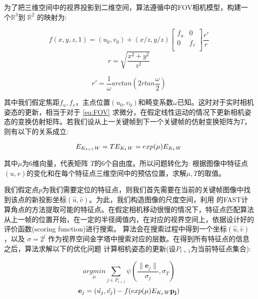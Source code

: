 为了把三维空间中的视界投影到二维空间，算法遵循\citep{deng:01a}中的FOV相机模型，构建一个$\mathbb{R}^3$到 $\mathbb{R}^2$ 的映射为:

\begin{equation}
\label{eq:FOV}
f(x,y,z,1)=(u_0,v_0) + (x/z,y/z) 
\begin{bmatrix}
       f_u  & 0 \\
       0 & f_v  \\
\end{bmatrix} \frac{r'}{r}
\end{equation}
\begin{equation}
r= \sqrt{\frac{x^2+y^2}{z^2}}
\end{equation}

\begin{equation}
r'= \frac{1}{\omega} arctan(2rtan\frac{\omega}{2})
\end{equation}

其中我们假定焦距$f_u,f_v$，主点位置$(u_0,v_0)$和畸变系数$\omega$已知。这时对于实时相机姿态的更新，相当于对于 \autoref{eq:FOV} 求微分，在假定线性运动的情况下更新相机姿态的变换仿射矩阵。若我们设从上一关键帧到下一个关键帧的仿射变换矩阵为$T$，则有以下的关系成立:

\begin{equation}
E_{K_{t+1}\mathit{W}}  = T E_{K_{t}\mathit{W}} = exp(\mu) E_{K_{t}\mathit{W}}
\end{equation}

其中$\mu$为6维向量，代表矩阵 $T$的6个自由度。所以问题转化为: 根据图像中特征点$(u,v)$的变化和在每个特征点三维空间中的预估位置，求解$\mu,T$的取值。


我们假定点$p$为我们需要定位的特征点，则我们首先需要在当前的关键帧图像中找到该点的新投影坐标$(\hat{u},\hat{v})$。为此，我们构造图像的尺度空间，利用 %
的FAST计算角点的方法提取可能的特征点。在假定相机移动很慢的情况下，特征点匹配算法从上一帧的位置开始，在一定的半径阈值内，在对应的视界空间上，依据设计好的评价函数(scoring function)进行搜索。
算法会在搜索过程中得到一个坐标$(\hat{u},\hat{v})$，以及 $\sigma=2^l$ 作为视界空间金字塔中搜索对应的层数。在得到所有特征点的信息之后，算法求解以下的优化问题
计算相机姿态的更新(设$P_{t+1}$为当前特征点集合):

\begin{equation}
\underset{\mu}{argmin} \sum_{j\in P_{t+1}} \psi( \frac{\lVert\mathbf{e}_j\rVert}{\sigma_j} , \sigma_T)
\end{equation}
\begin{equation}
\mathbf{e}_j= (\hat{u_j},\hat{v_j})- f(exp(\mu)E_{K_{t}\mathit{W}} \mathbf{p_j})
\end{equation}

